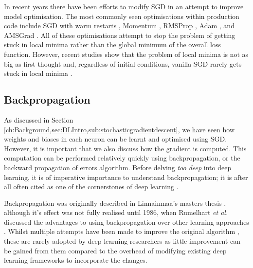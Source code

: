 In recent years there have been efforts to modify SGD in an attempt to improve model optimisation. The most commonly seen optimisations within production code include SGD with warm restarts \cite{loshchilov_sgdr:_2016}, Momentum \cite{qian_momentum_1999}, RMSProp \cite{tieleman_lecture_2012}, Adam \cite{kingma_adam:_2014}, and AMSGrad \cite{reddi_convergence_2019}. All of these optimisations attempt to stop the problem of getting stuck in local minima rather than the global minimum of the overall loss function. However, recent studies show that the problem of local minima is not as big as first thought and, regardless of initial conditions, vanilla SGD rarely gets stuck in local minima \cite{dauphin_identifying_2014, choromanska_loss_2015}.

\subsection{Backpropagation}\label{ch:Background,sec:DLIntro,sub:backprop}
As discussed in Section \ref{ch:Background,sec:DLIntro,sub:stochasticgradientdescent}, we have seen how weights and biases in each neuron can be learnt and optimised using SGD. However, it is important that we also discuss how the gradient is computed. This computation can be performed relatively quickly using backpropagation, or the backward propagation of errors algorithm. Before delving \textit{too deep} into deep learning, it is of imperative importance to understand backpropagation; it is after all often cited as one of the cornerstones of deep learning \cite{alber_backprop_2018}.

Backpropagation was originally described in Linnainmaa's masters thesis \cite{linnainmaa_representation_1970}, although it's effect was not fully realised until 1986, when Rumelhart \textit{et al.} discussed the advantages to using backpropagation over other learning approaches \cite{rumelhart_learning_1986}. Whilst multiple attempts have been made to improve the original algorithm \cite{bengio_use_1994, lillicrap_random_2014, lee_difference_2015, nokland_direct_2016, liao_how_2016}, these are rarely adopted by deep learning researchers as little improvement can be gained from them compared to the overhead of modifying existing deep learning frameworks to incorporate the changes. 

